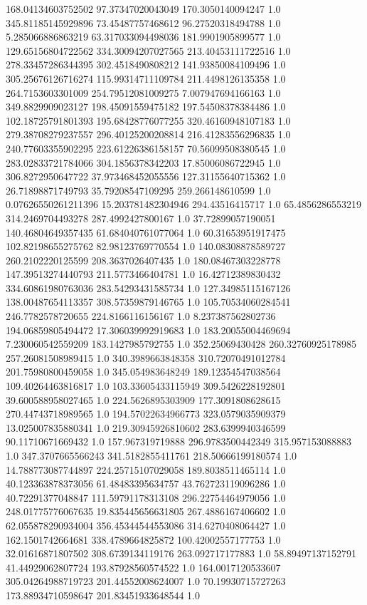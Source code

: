 168.04134603752502	97.37347020043049	170.3050140094247	1.0
345.81185145929896	73.45487757468612	96.27520318494788	1.0
5.285066886863219	63.317033094498036	181.9901905899577	1.0
129.65156804722562	334.30094207027565	213.40453111722516	1.0
278.33457286344395	302.4518490808212	141.93850084109496	1.0
305.25676126716274	115.99314711109784	211.4498126135358	1.0
264.7153603301009	254.79512081009275	7.007947694166163	1.0
349.8829909023127	198.45091559475182	197.54508378384486	1.0
102.18725791801393	195.68428776077255	320.46160948107183	1.0
279.38708279237557	296.40125200208814	216.41283556296835	1.0
240.77603355902295	223.61226386158157	70.56099508380545	1.0
283.02833721784066	304.1856378342203	17.85006086722945	1.0
306.8272950647722	37.973468452055556	127.31155640715362	1.0
26.71898871749793	35.79208547109295	259.266148610599	1.0
0.07626550261211396	15.203781482304946	294.43516415717	1.0
65.4856286553219	314.2469704493278	287.4992427800167	1.0
37.72899057190051	140.46804649357435	61.684040761077064	1.0
60.31653951917475	102.82198655275762	82.98123769770554	1.0
140.08308878589727	260.2102220125599	208.3637026407435	1.0
180.08467303228778	147.39513274440793	211.5773466404781	1.0
16.42712389830432	334.60861980763036	283.54293431585734	1.0
127.34985115167126	138.00487654113357	308.57359879146765	1.0
105.70534060284541	246.7782578720655	224.8166116156167	1.0
8.237387562802736	194.06859805494472	17.306039992919683	1.0
183.20055004469694	7.230060542559209	183.1427985792755	1.0
352.25069430428	260.32760925178985	257.26081508989415	1.0
340.3989663848358	310.72070491012784	201.75980800459058	1.0
345.054983648249	189.12354547038564	109.40264463816817	1.0
103.33605433115949	309.5426228192801	39.600588958027465	1.0
224.5626895303909	177.3091808628615	270.44743718989565	1.0
194.57022634966773	323.0579035909379	13.025007835880341	1.0
219.30945926810602	283.6399940346599	90.11710671669432	1.0
157.967319719888	296.9783500442349	315.957153088883	1.0
347.3707665566243	341.5182855411761	218.50666199180574	1.0
14.788773087744897	224.25715107029058	189.8038511465114	1.0
40.123363878373056	61.48483395634757	43.762723119096286	1.0
40.72291377048847	111.59791178313108	296.22754464979056	1.0
248.01775776067635	19.835445656631805	267.4886167406602	1.0
62.055878290934004	356.45344544553086	314.6270408064427	1.0
162.1501742664681	338.4789664825872	100.42002557177753	1.0
32.01616871807502	308.6739134119176	263.092717177883	1.0
58.89497137152791	41.44929062807724	193.87928560574522	1.0
164.0017120533607	305.04264988719723	201.44552008624007	1.0
70.19930715727263	173.88934710598647	201.83451933648544	1.0
